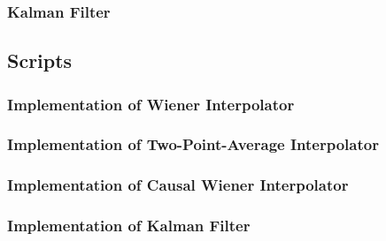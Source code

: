 \documentclass[11pt]{article}
\begin{document}
\subsubsection*{Kalman Filter}
\label{subsubsec:kalmanimplementation}



\appendix

\subsection*{Scripts}


\subsubsection*{Implementation of Wiener Interpolator}



\subsubsection*{Implementation of Two-Point-Average Interpolator}



\subsubsection*{Implementation of Causal Wiener Interpolator}



\subsubsection*{Implementation of Kalman Filter}
\end{document}
